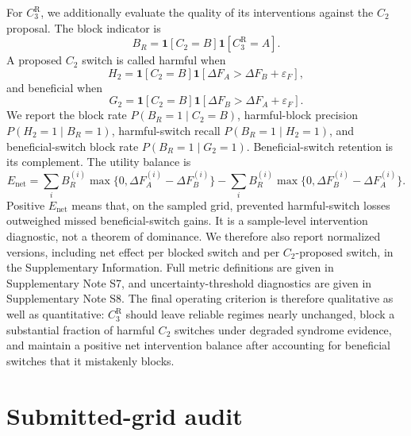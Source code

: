 \documentclass{iopjournal}
\begin{document}
For $C_3^{\mathrm{R}}$, we additionally evaluate the quality of its interventions
against the $C_2$ proposal. The block indicator is
\begin{equation}
B_R=\mathbf{1}[C_2=B]\mathbf{1}[C_3^{\mathrm{R}}=A].
\end{equation}
A proposed $C_2$ switch is called harmful when
\begin{equation}
H_2
=
\mathbf{1}[C_2=B]
\mathbf{1}[\Delta F_A>\Delta F_B+\varepsilon_F],
\end{equation}
and beneficial when
\begin{equation}
G_2
=
\mathbf{1}[C_2=B]
\mathbf{1}[\Delta F_B>\Delta F_A+\varepsilon_F].
\end{equation}
We report the block rate $P(B_R=1\mid C_2=B)$, harmful-block precision
$P(H_2=1\mid B_R=1)$, harmful-switch recall $P(B_R=1\mid H_2=1)$, and
beneficial-switch block rate $P(B_R=1\mid G_2=1)$. Beneficial-switch retention
is its complement. The utility balance is
\begin{equation}
E_{\mathrm{net}}
=
\sum_i B_R^{(i)}
\max\{0,\Delta F_A^{(i)}-\Delta F_B^{(i)}\}
-
\sum_i B_R^{(i)}
\max\{0,\Delta F_B^{(i)}-\Delta F_A^{(i)}\}.
\end{equation}
Positive $E_{\mathrm{net}}$ means that, on the sampled grid, prevented harmful-switch
losses outweighed missed beneficial-switch gains. It is a sample-level intervention
diagnostic, not a theorem of dominance. We therefore also report normalized
versions, including net effect per blocked switch and per $C_2$-proposed switch,
in the Supplementary Information. Full metric definitions are given in
Supplementary Note S7, and uncertainty-threshold diagnostics are given in
Supplementary Note S8.
The final operating criterion is therefore qualitative as well as quantitative:
$C_3^{\mathrm R}$ should leave reliable regimes nearly unchanged, block a
substantial fraction of harmful $C_2$ switches under degraded syndrome evidence,
and maintain a positive net intervention balance after accounting for beneficial
switches that it mistakenly blocks.

\FloatBarrier

\section{Submitted-grid audit}\label{sec:results}
\end{document}
